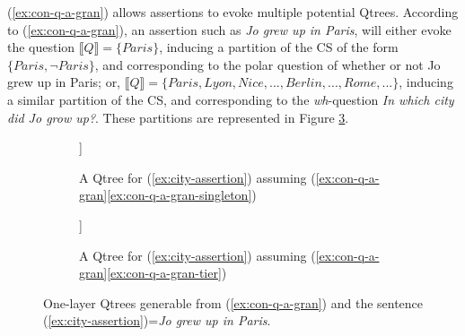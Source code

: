 (\ref{ex:con-q-a-gran}) allows assertions to evoke multiple potential Qtrees. According to (\ref{ex:con-q-a-gran}), an assertion such as \textit{Jo grew up in Paris}, will either evoke the question $\llbracket Q \rrbracket = \lbrace \textit{Paris} \rbrace$, inducing a partition of the CS of the form $\lbrace \textit{Paris}, \neg\textit{Paris}\rbrace$, and corresponding to the polar question of whether or not Jo grew up in Paris; or, $\llbracket Q \rrbracket = \lbrace \textit{Paris}, \textit{Lyon}, \textit{Nice}, ..., \textit{Berlin}, ..., \textit{Rome}, ... \rbrace$, inducing a similar partition of the CS, and corresponding to the \textit{wh}-question \textit{In which city did Jo grow up?}. These partitions are represented in Figure \ref{fig:one-layer-qtrees}. 

\begin{figure}[H]
	\centering
	\begin{subfigure}[t]{.45\linewidth}
		\centering
		\begin{forest}
			[CS [\textcolor{orange}{Paris}] [\textcolor{orange}{$\neg${Paris}}]]
		\end{forest}
		\caption{A Qtree for (\ref{ex:city-assertion}) assuming (\ref{ex:con-q-a-gran}\ref{ex:con-q-a-gran-singleton}) }\label{fig:one-layer-polar}
	\end{subfigure}
	\hfill
	\begin{subfigure}[t]{.5\linewidth}
		\centering
		\begin{forest}
			[CS [\textcolor{orange}{Paris}] [\textcolor{orange}{Lyon}] [\textcolor{orange}{...}] [\textcolor{orange}{Berlin}] [\textcolor{orange}{...}] [\textcolor{orange}{Rome}]]
		\end{forest}
		\caption{A Qtree for (\ref{ex:city-assertion}) assuming (\ref{ex:con-q-a-gran}\ref{ex:con-q-a-gran-tier})}\label{fig:one-layer-wh}
	\end{subfigure}
	\caption{One-layer Qtrees generable from (\ref{ex:con-q-a-gran}) and the sentence (\ref{ex:city-assertion})=\textit{Jo grew up in Paris}.}\label{fig:one-layer-qtrees}
\end{figure}

